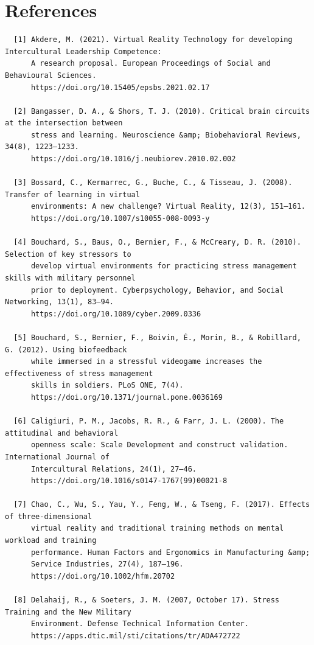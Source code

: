 \documentclass[manuscript,screen,review]{acmart}
\begin{document}
\section{References}
\begin{verbatim}
  [1] Akdere, M. (2021). Virtual Reality Technology for developing Intercultural Leadership Competence: 
      A research proposal. European Proceedings of Social and Behavioural Sciences. 
      https://doi.org/10.15405/epsbs.2021.02.17  

  [2] Bangasser, D. A., & Shors, T. J. (2010). Critical brain circuits at the intersection between 
      stress and learning. Neuroscience &amp; Biobehavioral Reviews, 34(8), 1223–1233. 
      https://doi.org/10.1016/j.neubiorev.2010.02.002  
  
  [3] Bossard, C., Kermarrec, G., Buche, C., & Tisseau, J. (2008). Transfer of learning in virtual 
      environments: A new challenge? Virtual Reality, 12(3), 151–161. 
      https://doi.org/10.1007/s10055-008-0093-y  
  
  [4] Bouchard, S., Baus, O., Bernier, F., & McCreary, D. R. (2010). Selection of key stressors to 
      develop virtual environments for practicing stress management skills with military personnel 
      prior to deployment. Cyberpsychology, Behavior, and Social Networking, 13(1), 83–94. 
      https://doi.org/10.1089/cyber.2009.0336  
  
  [5] Bouchard, S., Bernier, F., Boivin, É., Morin, B., & Robillard, G. (2012). Using biofeedback 
      while immersed in a stressful videogame increases the effectiveness of stress management 
      skills in soldiers. PLoS ONE, 7(4). 
      https://doi.org/10.1371/journal.pone.0036169  
  
  [6] Caligiuri, P. M., Jacobs, R. R., & Farr, J. L. (2000). The attitudinal and behavioral 
      openness scale: Scale Development and construct validation. International Journal of 
      Intercultural Relations, 24(1), 27–46. 
      https://doi.org/10.1016/s0147-1767(99)00021-8  
  
  [7] Chao, C., Wu, S., Yau, Y., Feng, W., & Tseng, F. (2017). Effects of three‐dimensional 
      virtual reality and traditional training methods on mental workload and training 
      performance. Human Factors and Ergonomics in Manufacturing &amp; 
      Service Industries, 27(4), 187–196. 
      https://doi.org/10.1002/hfm.20702  
  
  [8] Delahaij, R., & Soeters, J. M. (2007, October 17). Stress Training and the New Military 
      Environment. Defense Technical Information Center. 
      https://apps.dtic.mil/sti/citations/tr/ADA472722   
  

\end{verbatim}
\end{document}
